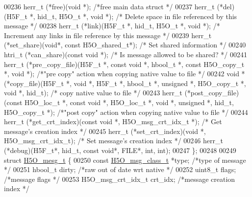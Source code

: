 \begin{DoxyCode}
00236     herr\_t  (*free)(\textcolor{keywordtype}{void} *);        \textcolor{comment}{/*free main data struct  */}
00237     herr\_t  (*del)(H5F\_t *, hid\_t, H5O\_t *, \textcolor{keywordtype}{void} *);    \textcolor{comment}{/* Delete space in file referenced by this message 
      */}
00238     herr\_t  (*link)(H5F\_t *, hid\_t, H5O\_t *, \textcolor{keywordtype}{void} *);   \textcolor{comment}{/* Increment any links in file reference by this
       message */}
00239     herr\_t  (*set\_share)(\textcolor{keywordtype}{void}*, \textcolor{keyword}{const} H5O\_shared\_t*);   \textcolor{comment}{/* Set shared information */}
00240     htri\_t  (*can\_share)(\textcolor{keyword}{const} \textcolor{keywordtype}{void} *); \textcolor{comment}{/* Is message allowed to be shared? */}
00241     herr\_t  (*pre\_copy\_file)(H5F\_t *, \textcolor{keyword}{const} \textcolor{keywordtype}{void} *, hbool\_t *, \textcolor{keyword}{const} H5O\_copy\_t *, \textcolor{keywordtype}{void} *); \textcolor{comment}{/*"pre copy"
       action when copying native value to file */}
00242     \textcolor{keywordtype}{void}    *(*copy\_file)(H5F\_t *, \textcolor{keywordtype}{void} *, H5F\_t *, hbool\_t *, \textcolor{keywordtype}{unsigned} *, H5O\_copy\_t *, \textcolor{keywordtype}{void} *, hid\_t); \textcolor{comment}{/*
      copy native value to file */}
00243     herr\_t  (*post\_copy\_file)(\textcolor{keyword}{const} H5O\_loc\_t *, \textcolor{keyword}{const} \textcolor{keywordtype}{void} *, H5O\_loc\_t *, \textcolor{keywordtype}{void} *, \textcolor{keywordtype}{unsigned} *, hid\_t, 
      H5O\_copy\_t *); \textcolor{comment}{/*"post copy" action when copying native value to file */}
00244     herr\_t      (*get\_crt\_index)(\textcolor{keyword}{const} \textcolor{keywordtype}{void} *, H5O\_msg\_crt\_idx\_t *);    \textcolor{comment}{/* Get message's creation index */}
00245     herr\_t      (*set\_crt\_index)(\textcolor{keywordtype}{void} *, H5O\_msg\_crt\_idx\_t);    \textcolor{comment}{/* Set message's creation index */}
00246     herr\_t  (*debug)(H5F\_t*, hid\_t, \textcolor{keyword}{const} \textcolor{keywordtype}{void}*, FILE*, int, int);
00247 \};
00248 
00249 \textcolor{keyword}{struct }\hyperlink{struct_h5_o__mesg__t}{H5O\_mesg\_t} \{
00250     \textcolor{keyword}{const} \hyperlink{struct_h5_o__msg__class__t}{H5O\_msg\_class\_t}    *type;  \textcolor{comment}{/*type of message            */}
00251     hbool\_t     dirty;      \textcolor{comment}{/*raw out of date wrt native         */}
00252     uint8\_t     flags;      \textcolor{comment}{/*message flags              */}
00253     H5O\_msg\_crt\_idx\_t   crt\_idx;        \textcolor{comment}{/*message creation index         */}

\end{DoxyCode}
